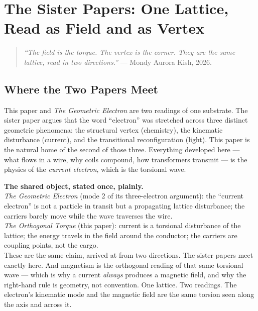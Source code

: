 \documentclass[11pt, letterpaper, openany]{book}
\begin{document}
\chapter{The Sister Papers: One Lattice, Read as Field and as Vertex}
 
\begin{quote}
\textit{``The field is the torque. The vertex is the corner. They are the
same lattice, read in two directions.''} --- Mondy Aurora Kish, 2026.
\end{quote}
 
\section{Where the Two Papers Meet}
 
This paper and \emph{The Geometric Electron} are two readings of one
substrate. The sister paper argues that the word ``electron'' was stretched
across three distinct geometric phenomena: the structural vertex
(chemistry), the kinematic disturbance (current), and the transitional
reconfiguration (light). This paper is the natural home of the second of
those three. Everything developed here --- what flows in a wire, why coils
compound, how transformers transmit --- is the physics of the
\emph{current electron}, which is the torsional wave.
 
\begin{bridgebox}
\textbf{The shared object, stated once, plainly.}\\[0.5em]
\emph{The Geometric Electron} (mode 2 of its three-electron argument): the
``current electron'' is not a particle in transit but a propagating lattice
disturbance; the carriers barely move while the wave traverses the wire.\\[0.4em]
\emph{The Orthogonal Torque} (this paper): current is a torsional
disturbance of the lattice; the energy travels in the field around the
conductor; the carriers are coupling points, not the cargo.\\[0.5em]
These are the same claim, arrived at from two directions. The sister papers
meet exactly here. And magnetism is the orthogonal reading of that same
torsional wave --- which is why a current \emph{always} produces a magnetic
field, and why the right-hand rule is geometry, not convention. One lattice.
Two readings. The electron's kinematic mode and the magnetic field are the
same torsion seen along the axis and across it.
\end{bridgebox}
 
\end{document}
